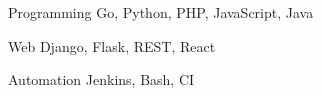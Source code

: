 

\begin{cvskills}

  \cvskill
    {Programming} %
    {Go, Python, PHP, JavaScript, Java} %

  \cvskill
    {Web} %
    {Django, Flask, REST, React} %
    
  \cvskill
    {Automation}
    {Jenkins, Bash, CI}


\end{cvskills}